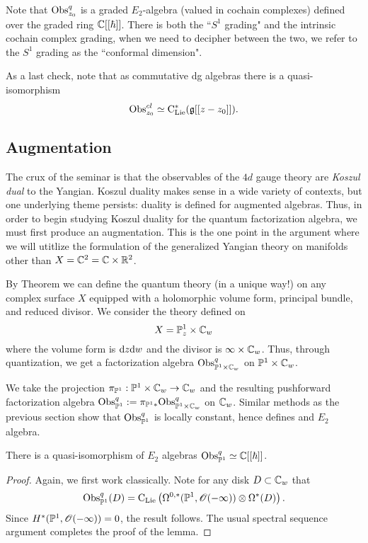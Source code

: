 \documentclass[11pt]{amsart}
\begin{document}
Note that ${\rm Obs}^{q}_{z_0}$ is a graded $E_2$-algebra (valued in cochain complexes) defined over the graded ring $\mathbb C[[\hbar]]$. 
There is both the ``$S^1$ grading" and the intrinsic cochain complex grading, when we need to decipher between the two, we refer to the $S^1$ grading as the ``conformal dimension".

As a last check, note that as commutative dg algebras there is a quasi-isomorphism
\[
{\rm Obs}^{cl}_{z_0} \simeq {\rm C}_{{\rm Lie}}^*(\mathfrak g[[z-z_0]]) .
\] 

\subsection{Augmentation}

The crux of the seminar is that the observables of the $4d$ gauge theory are {\em Koszul dual} to the Yangian. 
Koszul duality makes sense in a wide variety of contexts, but one underlying theme persists: duality is defined for augmented algebras. 
Thus, in order to begin studying Koszul duality for the quantum factorization algebra, we must first produce an augmentation. 
This is the one point in the argument where we will utitlize the formulation of the generalized Yangian theory on manifolds other than $X = \mathbb C^2 = \mathbb C \times \mathbb R^2$. 

By Theorem \cite{thm: bv quantization} we can define the quantum theory (in a unique way!) on any complex surface $X$ equipped with a holomorphic volume form, principal bundle, and reduced divisor. 
We consider the theory defined on
\[
X = \mathbb P^1_z \times \mathbb C_w
\]
where the volume form is ${\rm d} z {\rm d} w$ and the divisor is $\infty \times \mathbb C_w$. 
Thus, through quantization, we get a factorization algebra ${\rm Obs}^{q}_{\mathbb P^1 \times \mathbb C_w}$ on $\mathbb P^1 \times \mathbb C_w$. 

We take the projection $\pi_{\mathbb P^1} : \mathbb P^1 \times \mathbb C_w \to \mathbb C_w$ and the resulting pushforward factorization algebra ${\rm Obs}^q_{\mathbb P^1} := \pi_{\mathbb P^1 *} {\rm Obs}^q_{\mathbb P^1 \times \mathbb C_w}$ on $\mathbb C_w$. 
Similar methods as the previous section show that ${\rm Obs}^q_{\mathbb P^1}$ is locally constant, hence defines and $E_2$ algebra. 

\begin{lem}
There is a quasi-isomorphism of $E_2$ algebras ${\rm Obs}^q_{\mathbb P^1} \simeq \mathbb C[[\hbar]]$. 
\end{lem}
\begin{proof}
Again, we first work classically. 
Note for any disk $D \subset \mathbb C_w$ that
\[
{\rm Obs}^q_{\mathbb P^1}(D) = {\rm C}_{{\rm Lie}}\left(\Omega^{0,*}(\mathbb P^1, \mathscr O(-\infty)) \otimes \Omega^*(D)\right) .
\]  
Since $H^*(\mathbb P^1 , \mathscr O(-\infty)) = 0$, the result follows. 
The usual spectral sequence argument completes the proof of the lemma. 
\end{proof}
\end{document}
